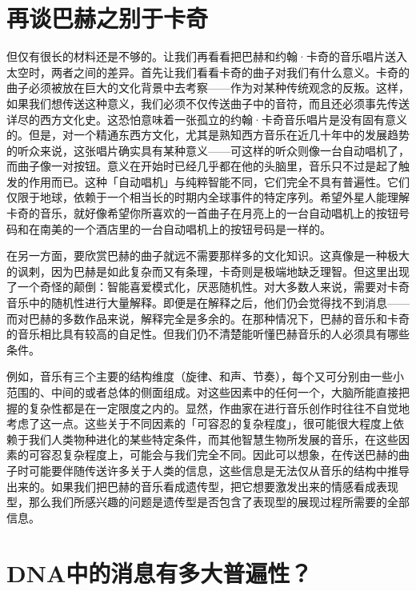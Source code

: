 \documentclass[
  12pt,
  twoside,
  openright,
  oldfontcommands,
]{memoir}
\begin{document}
\section{再谈巴赫之别于卡奇}

但仅有很长的材料还是不够的。让我们再看看把巴赫和约翰·卡奇的音乐唱片送入太空时，两者之间的差异。首先让我们看看卡奇的曲子对我们有什么意义。卡奇的曲子必须被放在巨大的文化背景中去考察------作为对某种传统观念的反叛。这样，如果我们想传送这种意义，我们必须不仅传送曲子中的音符，而且还必须事先传送详尽的西方文化史。这恐怕意味着一张孤立的约翰·卡奇音乐唱片是没有固有意义的。但是，对一个精通东西方文化，尤其是熟知西方音乐在近几十年中的发展趋势的听众来说，这张唱片确实具有某种意义------可这样的听众则像一台自动唱机了，而曲子像一对按钮。意义在开始时已经几乎都在他的头脑里，音乐只不过是起了触发的作用而已。这种「自动唱机」与纯粹智能不同，它们完全不具有普遍性。它们仅限于地球，依赖于一个相当长的时期内全球事件的特定序列。希望外星人能理解卡奇的音乐，就好像希望你所喜欢的一首曲子在月亮上的一台自动唱机上的按钮号码和在南美的一个酒店里的一台自动唱机上的按钮号码是一样的。

在另一方面，要欣赏巴赫的曲子就远不需要那样多的文化知识。这真像是一种极大的讽剌，因为巴赫是如此复杂而又有条理，卡奇则是极端地缺乏理智。但这里出现了一个奇怪的颠倒：智能喜爱模式化，厌恶随机性。对大多数人来说，需要对卡奇音乐中的随机性进行大量解释。即便是在解释之后，他们仍会觉得找不到消息------而对巴赫的多数作品来说，解释完全是多余的。在那种情况下，巴赫的音乐和卡奇的音乐相比具有较高的自足性。但我们仍不清楚能听懂巴赫音乐的人必须具有哪些条件。

例如，音乐有三个主要的结构维度（旋律、和声、节奏），每个又可分别由一些小范围的、中间的或者总体的侧面组成。对这些因素中的任何一个，大脑所能直接把握的复杂性都是在一定限度之内的。显然，作曲家在进行音乐创作时往往不自觉地考虑了这一点。这些关于不同因素的「可容忍的复杂程度」，很可能很大程度上依赖于我们人类物种进化的某些特定条件，而其他智慧生物所发展的音乐，在这些因素的可容忍复杂程度上，可能会与我们完全不同。因此可以想象，在传送巴赫的曲子时可能要伴随传送许多关于人类的信息，这些信息是无法仅从音乐的结构中推导出来的。如果我们把巴赫的音乐看成遗传型，把它想要激发出来的情感看成表现型，那么我们所感兴趣的问题是遗传型是否包含了表现型的展现过程所需要的全部信息。

\section{DNA中的消息有多大普遍性？}
\end{document}
